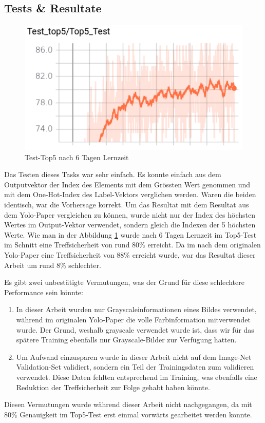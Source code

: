 \subsection{Tests \& Resultate}
\begin{figure}	
	\centering
	\includegraphics[width=.7\textwidth]{Kapitel/20Pretraining/Bilder/Test_top5.pdf}
	\caption{Test-Top5 nach 6 Tagen Lernzeit}
	\label{img:test_top5}
\end{figure}   
Das Testen dieses Tasks war sehr einfach.
Es konnte einfach aus dem Outputvektor der Index des Elements mit dem Grössten Wert genommen und mit dem One-Hot-Index des Label-Vektors verglichen werden. 
Waren die beiden identisch, war die Vorhersage korrekt. 
Um das Resultat mit dem Resultat aus dem Yolo-Paper \cite{yolo} vergleichen zu können, wurde nicht nur der Index des höchsten Wertes im Output-Vektor verwendet, sondern gleich die Indexen der 5 höchsten Werte. 
Wie man in der Abbildung \ref{img:test_top5} wurde nach 6 Tagen Lernzeit im Top5-Test im Schnitt eine Treffsicherheit von rund 80\% erreicht.
Da im nach dem originalen Yolo-Paper \cite{yolo} eine Treffsicherheit von 88\% erreicht wurde, war das Resultat dieser Arbeit um rund 8\% schlechter.

Es gibt zwei unbestätigte Vermutungen, was der Grund für diese schlechtere Performance sein könnte: 
\begin{enumerate}
\item In dieser Arbeit wurden nur Grayscaleinformationen eines Bildes verwendet, während im originalen Yolo-Paper \cite{yolo} die volle Farbinformation mitverwendet wurde. Der Grund, weshalb grayscale verwendet wurde ist, dass wir für das spätere Training ebenfalls nur Grayscale-Bilder zur Verfügung hatten.
\item Um Aufwand einzusparen wurde in dieser Arbeit nicht auf dem Image-Net Validation-Set validiert, sondern ein Teil der Trainingsdaten zum validieren verwendet. Diese Daten fehlten entsprechend im Training, was ebenfalls eine Reduktion der Treffsicherheit zur Folge gehabt haben könnte. 
\end{enumerate}
Diesen Vermutungen wurde während dieser Arbeit nicht nachgegangen, da mit 80\% Genauigkeit im Top5-Test erst einmal vorwärts gearbeitet werden konnte. 



